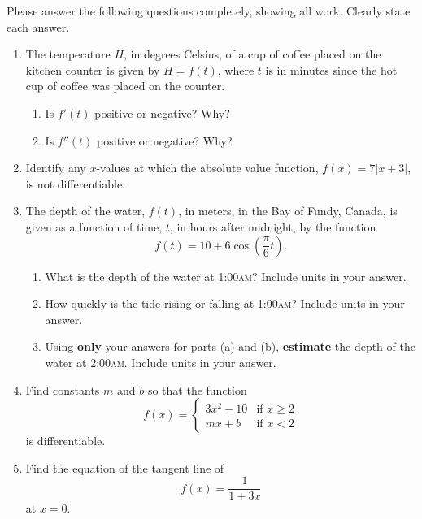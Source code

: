 \documentclass[11pt]{article}
\begin{document}
\drawtitle

\noindent Please answer the following questions completely, showing
all work.  Clearly state each answer.

\begin{enumerate}
\item The temperature $H$, in degrees Celsius, of a cup of coffee
  placed on the kitchen counter is given by $H=f(t)$, where $t$ is in
  minutes since the hot cup of coffee was placed on the counter.
  \begin{enumerate}
  \item Is $f'(t)$ positive or negative? Why?\vfill
  \item Is $f''(t)$ positive or negative? Why?\vfill
  \end{enumerate}

\item Identify any $x$-values at which the absolute value function,
  $f(x)=7|x+3|$, is not differentiable.

\vfill
\newpage

\item The depth of the water, $f(t)$, in meters, in the Bay of Fundy,
  Canada, is given as a function of time, $t$, in hours after
  midnight, by the function
  \[
  f(t)=10+6\cos\left(\frac{\pi}{6}t\right).
  \]
  \begin{enumerate}
  \item What is the depth of the water at 1:00\textsc{am}?
    Include units in your answer. \vfill
  \item How quickly is the tide rising or falling at 1:00\textsc{am}?  Include
    units in your answer. \vfill
  \item Using {\bf only} your answers for parts (a) and (b), {\bf estimate} the depth
    of the water at 2:00\textsc{am}. Include units in your answer. \vfill
  \end{enumerate}

\newpage

\item Find constants $m$ and $b$ so that the function
  \[
  f(x) = \begin{cases} 3x^2-10 &\mbox{if } x\geq 2\\
    mx+b &\mbox{if } x < 2 \end{cases}
  \]
  is differentiable.

\vfill
\newpage

\item Find the equation of the tangent line of
  \[
  f(x)=\frac{1}{1+3x}
  \]
  at $x=0$.


\end{enumerate}
\end{document}
